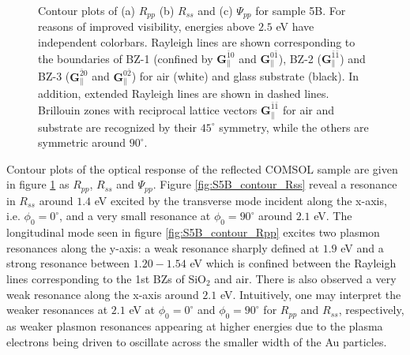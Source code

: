 \begin{figure}
    \caption{Contour plots of (a) $R_{pp}$ (b) $R_{ss}$ and (c) $\Psi_{pp}$ for sample 5B. For reasons of improved visibility, energies above $2.5$ eV have independent colorbars. Rayleigh lines are shown corresponding to the boundaries of BZ-1 (confined by $\mathbf{G}_\parallel^{\bar{1}0}$ and $\mathbf{G}_\parallel^{0\bar{1}}$), BZ-2 ($\mathbf{G}_\parallel^{\bar{1}\bar{1}}$) and BZ-3 ($\mathbf{G}_\parallel^{\bar{2}0}$ and $\mathbf{G}_\parallel^{0\bar{2}}$) for air (white) and glass substrate (black). In addition, extended Rayleigh lines are shown in dashed lines. Brillouin zones with reciprocal lattice vectors $\mathbf{G}_\parallel^{\bar{1}\bar{1}}$ for air and substrate are recognized by their $45^\circ$ symmetry, while the others are symmetric around $90^\circ$.}
    \label{fig:S5B_contour_RppRss_Psipp}
\end{figure}
Contour plots of the optical response of the reflected COMSOL sample are given in figure \ref{fig:S5B_contour_RppRss_Psipp} as $R_{pp}$, $R_{ss}$ and $\Psi_{pp}$. Figure \ref{fig:S5B_contour_Rss} reveal a resonance in $R_{ss}$ around $1.4$ eV excited by the transverse mode incident along the x-axis, i.e. $\phi_0=0^\circ$, and a very small resonance at $\phi_0=90^\circ$ around $2.1$ eV. The longitudinal mode seen in figure \ref{fig:S5B_contour_Rpp} excites two plasmon resonances along the y-axis: a weak resonance sharply defined at $1.9$ eV and a strong resonance between $1.20-1.54$ eV which is confined between the Rayleigh lines corresponding to the 1st BZs of SiO$_2$ and air. There is also observed a very weak resonance along the x-axis around $2.1$ eV. Intuitively, one may interpret the weaker resonances at $2.1$ eV at $\phi_0=0^\circ$ and $\phi_0=90^\circ$ for $R_{pp}$ and $R_{ss}$, respectively, as weaker plasmon resonances appearing at higher energies due to the plasma electrons being driven to oscillate across the smaller width of the Au particles.

